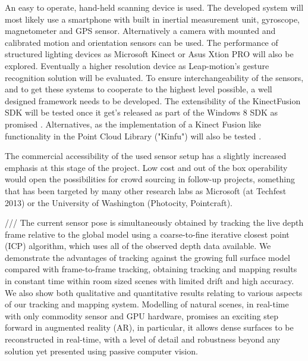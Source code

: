 \documentclass{ucl_thesis}
\begin{document}
\par An easy to operate, hand-held scanning device is used. The developed system will most likely use a smartphone with built in inertial measurement unit, gyroscope, magnetometer and GPS sensor. Alternatively a camera with mounted and calibrated motion and orientation sensors can be used. The performance of structured lighting devices as Microsoft Kinect \cite{Kinect} or Asus Xtion PRO \cite{XtionPro} will also be explored. Eventually a higher resolution device as Leap-motion's gesture recognition solution \cite{LeapMotion} will be evaluated. To ensure interchangeability of the sensors, and to get these systems to cooperate to the highest level possible, a well designed framework needs to be developed. The extensibility of the KinectFusion SDK will be tested once it get's released as part of the Windows 8 SDK as promised \cite{SDKKinectFusion}. Alternatives, as the implementation of a Kinect Fusion like functionality in the Point Cloud Library ("Kinfu") will also be tested \cite{KinFu}.
\par The commercial accessibility of the used sensor setup has a slightly increased emphasis at this stage of the project. Low cost and out of the box operability would open the possibilities for crowd sourcing in follow-up projects, something that has been targeted by many other research labs as Microsoft (at Techfest 2013) or the University of Washington (Photocity, Pointcraft).

/// The current sensor pose is simultaneously obtained by
tracking the live depth frame relative to the global model using a
coarse-to-fine iterative closest point (ICP) algorithm, which uses
all of the observed depth data available. We demonstrate the advantages
of tracking against the growing full surface model compared
with frame-to-frame tracking, obtaining tracking and mapping results
in constant time within room sized scenes with limited drift
and high accuracy. We also show both qualitative and quantitative
results relating to various aspects of our tracking and mapping system.
Modelling of natural scenes, in real-time with only commodity
sensor and GPU hardware, promises an exciting step forward
in augmented reality (AR), in particular, it allows dense surfaces to
be reconstructed in real-time, with a level of detail and robustness
beyond any solution yet presented using passive computer vision.
\end{document}
